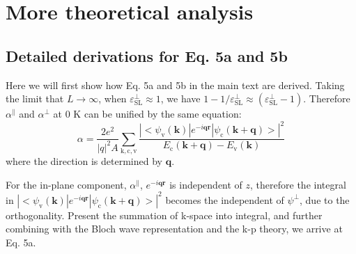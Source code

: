 \documentclass[manuscript=suppinfo,email=true,hyperref=true,keywords=false]{achemso}
\begin{document}
\section{More theoretical analysis}
\label{eq:MG-effect-1}

\subsection{Detailed derivations for Eq. 5a and 5b}
\label{sec:theory-1}

Here we will first show how Eq. 5a and 5b in the main text are
derived. Taking the limit that $L\to\infty$, when
$\varepsilon^{\perp}_{\mathrm{SL}} \approx 1$, we have
$1-1/\varepsilon^{\perp}_{\mathrm{SL}} \approx
(\varepsilon_{\mathrm{SL}}^{\perp} - 1)$. Therefore
$\alpha^{\parallel}$ and $\alpha^{\perp}$ at 0 K can be unified by the
same equation:
\begin{equation}
  \label{eq:alpha-RPA}
  \alpha = \frac{2e^{2}}{|q|^{2}A} \sum_{\mathrm{k,c,v}}
  \frac{|<\psi_{\mathrm{v}}(\mathbf{k})|e^{-i\mathbf{q}\mathbf{r}}|\psi_{\mathrm{c}}(\mathbf{k+q})>|^{2}}
  {E_{\mathrm{c}}(\mathbf{k+q}) - E_{\mathrm{v}}(\mathbf{k})}
\end{equation}
where the direction is determined by $\mathbf{q}$.

For the in-plane component, $\alpha^{\parallel}$, $e^{-i\mathbf{qr}}$
is independent of $z$, therefore the integral in
$|<\psi_{\mathrm{v}}(\mathbf{k})|e^{-i\mathbf{q}\mathbf{r}}|\psi_{\mathrm{c}}(\mathbf{k+q})>|^{2}$
becomes the independent of $\psi^{\perp}$, due to the
orthogonality. Present the summation of k-space into integral, and further
combining with the Bloch wave representation and the k-p
theory\cite{Jiang_2017_Eg_Eb}, we arrive at Eq. 5a.
\end{document}
